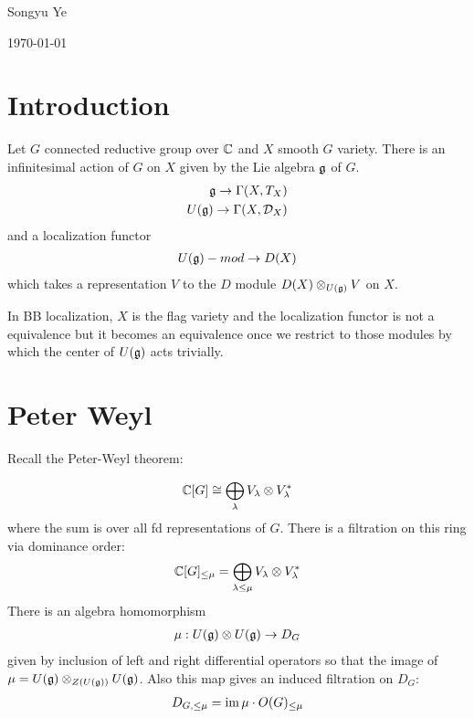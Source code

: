 \documentclass[12pt]{article}
\begin{document}
Songyu Ye

\today

\hfill

\section{Introduction}
Let $G$ connected reductive group over $\mathbb{C}$ and $X$ smooth $G$
variety. There is an infinitesimal action of $G$ on $X$ given by the
Lie algebra $\mathfrak{g}$ of $G$.
\begin{align*}
    \mathfrak{g} \to \Gamma(X,T_X) \\
    U(\mathfrak{g}) \to \Gamma(X,{\mathcal{D}}_X)
\end{align*} and a localization functor \begin{align*}
    U(\mathfrak{g})-mod \to D(X)
\end{align*}
which takes a representation $V$ to the $D$ module $D(X)\otimes_{U(\mathfrak{g})} V$ on $X$.

\hfil 

In BB localization, $X$ is the flag variety and the localization functor is not a equivalence
but it becomes an equivalence once we restrict to those modules by which the center of $U(\mathfrak{g})$ 
acts trivially.

\section{Peter Weyl}

Recall the Peter-Weyl theorem: 

\begin{align*}
    \mathbb{C}[G] \cong \bigoplus_{\lambda} V_{\lambda} \otimes V_{\lambda}^*
\end{align*} where the sum is over all fd representations of $G$.
There is a filtration on this ring via dominance order: \begin{align*}
    \mathbb{C}[G]_{\leq \mu} = \bigoplus_{\lambda \leq \mu} V_{\lambda} \otimes V_{\lambda}^*
\end{align*} There is an algebra homomorphism \begin{align*}
    \mu: U(\mathfrak{g}) \otimes U(\mathfrak{g}) \to D_G
\end{align*} given by inclusion of left and right differential operators
so that the image of $\mu = U(\mathfrak{g}) \otimes_{Z(U(\mathfrak{g}))} U(\mathfrak{g})$. Also this map gives an induced filtration on 
$D_G$: \begin{align*}
    D_{G,\leq\mu} = \operatorname{im}\mu\cdot O(G)_{\leq\mu}
\end{align*}
\end{document}
